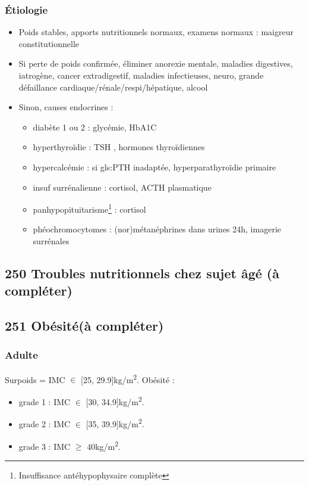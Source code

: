 \documentclass[11pt]{article}
\begin{document}
\subsubsection{Étiologie}
\label{sec:org9a8780c}
\begin{itemize}
\item Poids stables, apports nutritionnels normaux, examens normaux :  maigreur
constitutionnelle
\item Si perte de poids confirmée, éliminer anorexie mentale, maladies digestives,
iatrogène, cancer extradigestif, maladies infectieuses, neuro, grande
défaillance cardiaque/rénale/respi/hépatique, alcool
\item Sinon, causes endocrines :
\begin{itemize}
\item diabète 1 ou 2 : glycémie, HbA1C
\item hyperthyroïdie : TSH \dec\dec, hormones thyroïdiennes \inc
\item hypercalcémie : si gls:PTH inadaptée, hyperparathyroïdie primaire
\item insuf surrénalienne : cortisol, ACTH plasmatique
\item panhypopituitarisme\footnote{Insuffisance antéhypophysaire complète} : cortisol \dec
\item phéochromocytomes : (nor)métanéphrines dans urines 24h, imagerie surrénales
\end{itemize}
\end{itemize}
\subsection{250 \textdagger{} Troubles nutritionnels chez sujet âgé (à compléter)}
\label{sec:orga34c683}
\subsection{251 \textdagger{} Obésité(à compléter)}
\label{sec:orga8c0e37}
\subsubsection{Adulte}
\label{sec:org729c469}
Surpoids = IMC \(\in\) [25, 29.9]kg/m\textsuperscript{2}. Obésité :
\begin{itemize}
\item grade 1 : IMC \(\in\) [30, 34.9]kg/m\textsuperscript{2}.
\item grade 2 : IMC \(\in\) [35, 39.9]kg/m\textsuperscript{2}.
\item grade 3 : IMC \(\ge\) 40kg/m\textsuperscript{2}.
\end{itemize}
\end{document}
